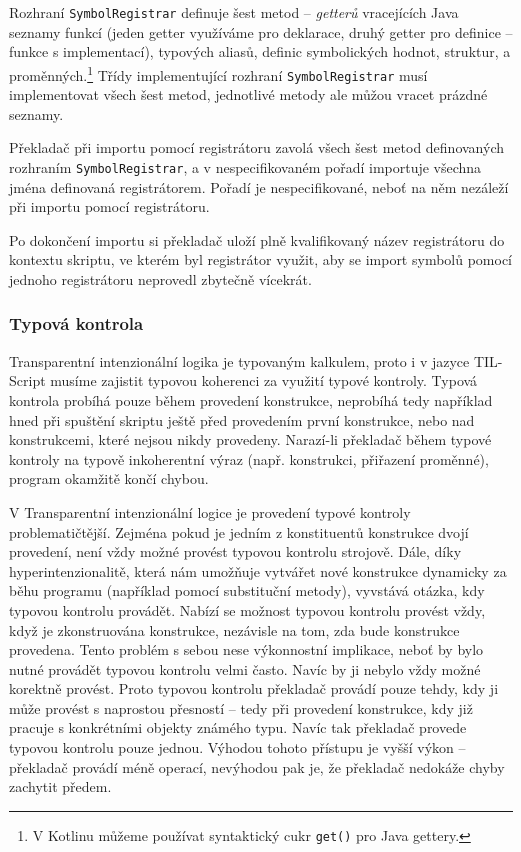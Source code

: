 Rozhraní \lstinline{SymbolRegistrar} definuje šest metod -- \textit{getterů} vracejících Java
seznamy funkcí (jeden getter využíváme pro deklarace, druhý getter pro definice -- funkce
s implementací), typových aliasů, definic symbolických hodnot, struktur, a proměnných.\footnote{
  V Kotlinu můžeme používat syntaktický cukr \lstinline{get()} pro Java gettery.}
Třídy implementující rozhraní \lstinline{SymbolRegistrar} musí implementovat všech šest metod,
jednotlivé metody ale můžou vracet prázdné seznamy.

Překladač při importu pomocí registrátoru zavolá všech šest metod definovaných rozhraním
\lstinline{SymbolRegistrar}, a v nespecifikovaném pořadí importuje všechna jména definovaná
registrátorem. Pořadí je nespecifikované, neboť na něm nezáleží při importu pomocí registrátoru.

Po dokončení importu si překladač uloží plně kvalifikovaný název registrátoru do kontextu skriptu,
ve kterém byl registrátor využit, aby se import symbolů pomocí jednoho registrátoru neprovedl
zbytečně vícekrát.

\subsubsection{Typová kontrola}\label{type-checking}

Transparentní intenzionální logika je typovaným kalkulem, proto i v jazyce TIL-Script musíme
zajistit typovou koherenci za využití typové kontroly. Typová kontrola probíhá pouze během provedení
konstrukce, neprobíhá tedy například hned při spuštění skriptu ještě před provedením první
konstrukce, nebo nad konstrukcemi, které nejsou nikdy provedeny. Narazí-li překladač během typové
kontroly na typově inkoherentní výraz (např. konstrukci, přiřazení proměnné), program okamžitě
končí chybou.

V Transparentní intenzionální logice je provedení typové kontroly problematičtější. Zejména pokud
je jedním z konstituentů konstrukce dvojí provedení, není vždy možné provést typovou kontrolu
strojově. Dále, díky hyperintenzionalitě, která nám umožňuje vytvářet nové konstrukce dynamicky
za běhu programu (například pomocí substituční metody), vyvstává otázka, kdy typovou kontrolu
provádět. Nabízí se možnost typovou kontrolu provést vždy, když je zkonstruována konstrukce,
nezávisle na tom, zda bude konstrukce provedena. Tento problém s sebou nese výkonnostní implikace,
neboť by bylo nutné provádět typovou kontrolu velmi často. Navíc by ji nebylo vždy možné korektně
provést. Proto typovou kontrolu překladač provádí pouze tehdy, kdy ji může provést s naprostou
přesností -- tedy při provedení konstrukce, kdy již pracuje s konkrétními objekty známého typu. Navíc
tak překladač provede typovou kontrolu pouze jednou. Výhodou tohoto přístupu je vyšší výkon --
překladač provádí méně operací, nevýhodou pak je, že překladač nedokáže chyby zachytit předem.

